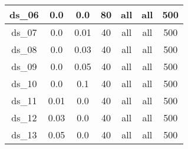 \begin{table}[H]
\begin{tabular}{|c|c|c|c|c|c|c|}
ds\_06                              & 0.0                                             & 0.0                                            & 80                                      & all                                   & all                                    & 500                                     \\ \hline
ds\_07                              & 0.0                                             & 0.01                                           & 40                                      & all                                   & all                                    & 500                                     \\ \hline
ds\_08                              & 0.0                                             & 0.03                                           & 40                                      & all                                   & all                                    & 500                                     \\ \hline
ds\_09                              & 0.0                                             & 0.05                                           & 40                                      & all                                   & all                                    & 500                                     \\ \hline
ds\_10                              & 0.0                                             & 0.1                                            & 40                                      & all                                   & all                                    & 500                                     \\ \hline
ds\_11                              & 0.01                                            & 0.0                                            & 40                                      & all                                   & all                                    & 500                                     \\ \hline
ds\_12                              & 0.03                                            & 0.0                                            & 40                                      & all                                   & all                                    & 500                                     \\ \hline
ds\_13                              & 0.05                                            & 0.0                                            & 40                                      & all                                   & all                                    & 500                                     \\ \hline

\end{tabular}
\end{table}
